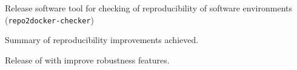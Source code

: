 \begin{workpackage}
\begin{wpdescription}
%

\end{wpdescription}

\begin{tasklist}






\end{tasklist}


\begin{wpdelivs}


  \begin{wpdeliv}[due=12,id=deliv-id-repo2docker-checker-software,dissem=PU,nature=OTHER,lead=SRL]
    {Release software tool for checking of reproducibility of software
      environments (\texttt{repo2docker-checker})}
  \end{wpdeliv}

  \begin{wpdeliv}[due=24,id=repo2docker-checker-study-report,dissem=PU,nature=R,lead=SRL]
    {Summary of reproducibility improvements achieved.}
  \end{wpdeliv}

  \begin{wpdeliv}[due=24,id=repo2docker-release24,dissem=PU,nature=R,lead=SRL]
    {Release of \repotodocker{} with improve robustness features.}
  \end{wpdeliv}

\end{wpdelivs}

\end{workpackage}

